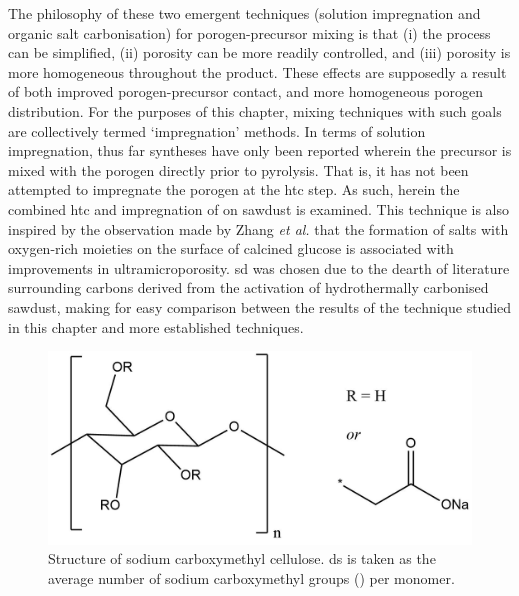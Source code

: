 The philosophy of these two emergent techniques (solution impregnation and organic salt carbonisation) for porogen-precursor mixing is that (i) the process can be simplified, (ii) porosity can be more readily controlled, and (iii) porosity is more homogeneous throughout the product. These effects are supposedly a result of both improved \gls{porogen}-precursor contact, and more homogeneous \gls{porogen} distribution. For the purposes of this chapter, mixing techniques with such goals are collectively termed `impregnation' methods. In terms of solution impregnation, thus far syntheses have only been reported wherein the precursor is mixed with the \gls{porogen} directly prior to pyrolysis.\citep{Botome2017Preparation, Ge2019Highly, Adlak2021Physicochemical, Shi2021Copper, Han2021Mulch, Boujibar2018CO2} That is, it has not been attempted to impregnate the \gls{porogen} at the \gls{htc} step. As such, herein the combined \gls{htc} and impregnation of  on sawdust is examined. This technique is also inspired by the observation made by Zhang \textit{et al.} that the formation of  salts with oxygen-rich moieties on the surface of calcined glucose is associated with improvements in ultramicroporosity.\citep{Zhang2019situ} \acrfull{sd} was chosen due to the dearth of literature surrounding carbons derived from the activation of hydrothermally carbonised sawdust,\citep{Balahmar2019Pre, Aljumialy2020Porous, Cox2017Ultra, Balahmar2015Generalized} making for easy comparison between the results of the technique studied in this chapter and more established techniques.

\begin{figure}[b!]
    \centering
    \includegraphics[width=0.8\columnwidth]{4-impregnation/figs/nc_structure.png}
    \caption{Structure of sodium carboxymethyl cellulose. \Acrfull{ds} is taken as the average number of sodium carboxymethyl groups () per monomer.}
    \label{fig:nc_structure}
\end{figure}

